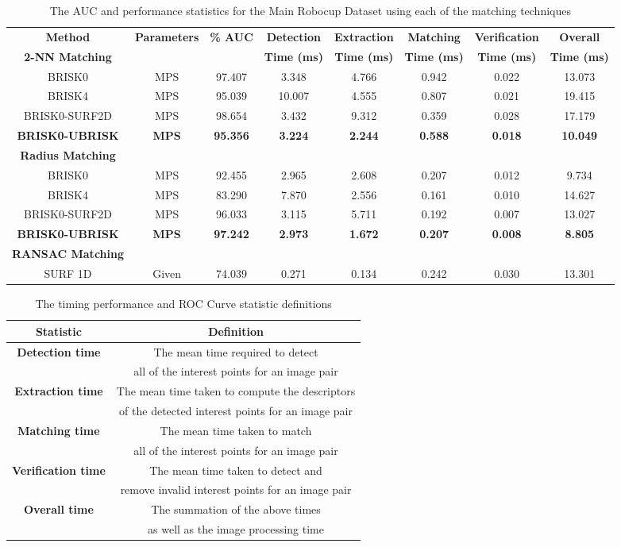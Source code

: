 \documentclass[11pt]{report}
\begin{document}
\begin{table}
\centering
\caption{The AUC and performance statistics for the Main Robocup Dataset using
each of the matching techniques}
\footnotesize
\begin{tabular}{|c|c|c|c|c|c|c|c|}
\hline 
\textbf{Method } & \textbf{Parameters} & \textbf{\% AUC} & \textbf{Detection} & \textbf{Extraction} & \textbf{Matching} & \textbf{Verification} & \textbf{Overall}\tabularnewline
\textbf{2-NN Matching} &  &  & \textbf{Time (ms)} & \textbf{Time (ms)} & \textbf{Time (ms)} & \textbf{Time (ms)} & \textbf{Time (ms)}\tabularnewline
\hline 
\hline 
BRISK0 & MPS & 97.407 & 3.348 & 4.766 & 0.942 & 0.022 & 13.073\tabularnewline
\hline 
BRISK4 & MPS & 95.039 & 10.007 & 4.555 & 0.807 & 0.021 & 19.415\tabularnewline
\hline 
BRISK0-SURF2D & MPS & 98.654 & 3.432 & 9.312 & 0.359 & 0.028 & 17.179\tabularnewline
\hline 
\textbf{BRISK0-UBRISK} & \textbf{MPS} & \textbf{95.356} & \textbf{3.224} & \textbf{2.244} & \textbf{0.588} & \textbf{0.018} & \textbf{10.049}\tabularnewline
\hline 
\hline 
\textbf{Radius Matching} &  &  &  &  &  &  & \tabularnewline
\hline 
BRISK0 & MPS & 92.455 & 2.965 & 2.608 & 0.207 & 0.012 & 9.734\tabularnewline
\hline 
BRISK4 & MPS & 83.290 & 7.870 & 2.556 & 0.161 & 0.010 & 14.627\tabularnewline
\hline 
BRISK0-SURF2D & MPS & 96.033 & 3.115 & 5.711 & 0.192 & 0.007 & 13.027\tabularnewline
\hline 
\textbf{BRISK0-UBRISK} & \textbf{MPS} & \textbf{97.242} & \textbf{2.973} & \textbf{1.672} & \textbf{0.207} & \textbf{0.008} & \textbf{8.805}\tabularnewline
\hline 
\hline 
\textbf{RANSAC Matching} &  &  &  &  &  &  & \tabularnewline
\hline 
SURF 1D & Given & 74.039 & 0.271 & 0.134 & 0.242 & 0.030 & 13.301\tabularnewline
\hline 
\end{tabular}
\label{tab:mrd_times}
\end{table}

\begin{table}
\centering
\caption{The timing performance and ROC Curve statistic definitions}
\begin{tabular}{|c|c|}
\hline 
\textbf{Statistic} & \textbf{Definition}\tabularnewline
\hline 
\hline 
\textbf{Detection time} & The mean time required to detect \tabularnewline
 & all of the interest points for an image pair\tabularnewline
\hline 
\textbf{Extraction time} & The mean time taken to compute the descriptors \tabularnewline
 & of the detected interest points for an image pair\tabularnewline
\hline 
\textbf{Matching time} & The mean time taken to match \tabularnewline
 & all of the interest points for an image pair\tabularnewline
\hline 
\textbf{Verification time} & The mean time taken to detect and \tabularnewline
 & remove invalid interest points for an image pair\tabularnewline
\hline 
\textbf{Overall time} & The summation of the above times\tabularnewline
 &  as well as the image processing time\tabularnewline
\hline 
\end{tabular}
\label{tab:definitions}
\end{table}
\end{document}
